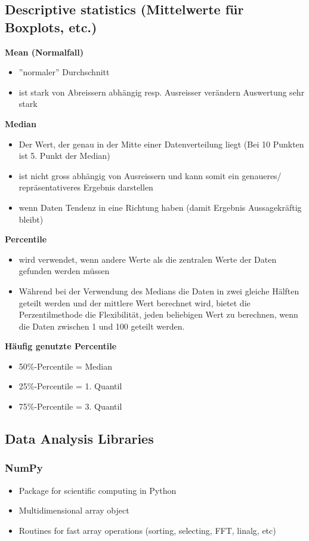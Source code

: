 \subsection{Descriptive statistics (Mittelwerte für Boxplots, etc.)}
\textbf{Mean (Normalfall)}
\begin{itemize}
    \item ''normaler'' Durchschnitt
    \item ist stark von Abreissern abhängig resp. Ausreisser verändern Auswertung sehr stark
\end{itemize}
\textbf{Median}
\begin{itemize}
    \item Der Wert, der genau in der Mitte einer Datenverteilung liegt (Bei 10 Punkten ist 5. Punkt der Median)
    \item ist nicht gross abhängig von Ausreissern und kann somit ein genaueres/ repräsentativeres Ergebnis darstellen
    \item wenn Daten Tendenz in eine Richtung haben (damit Ergebnis Aussagekräftig bleibt)
\end{itemize}
\textbf{Percentile}
\begin{itemize}
    \item wird verwendet, wenn andere Werte als die zentralen Werte der Daten gefunden werden müssen \item Während bei der Verwendung des Medians die Daten in zwei gleiche Hälften geteilt werden und der mittlere Wert berechnet wird, bietet die Perzentilmethode die Flexibilität, jeden beliebigen Wert zu berechnen, wenn die Daten zwischen 1 und 100 geteilt werden. 
\end{itemize}
\textbf{Häufig genutzte Percentile}
\begin{itemize}
    \item 50\%-Percentile = Median
    \item 25\%-Percentile = 1. Quantil
    \item 75\%-Percentile = 3. Quantil
\end{itemize}

\subsection{Data Analysis Libraries}
\subsubsection{NumPy}
\begin{itemize}
    \item Package for scientific computing in Python
    \item Multidimensional array object
    \item Routines for fast array operations (sorting, selecting, FFT, linalg, etc)
\end{itemize}

